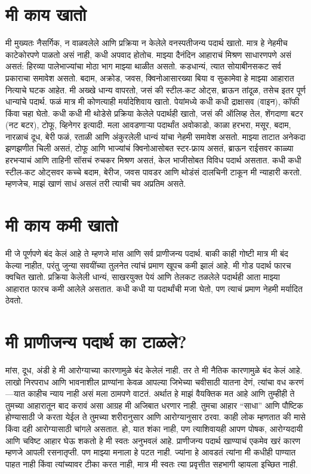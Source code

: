 \section*{मी काय खातो}
मी मुख्यतः नैसर्गिक, न वाळवलेले आणि प्रक्रिया न केलेले वनस्पतीजन्य पदार्थ खातो. मात्र हे नेहमीच काटेकोरपणे पाळतो असं नाही, कधी अपवाद होतोच. माझ्या दैनंदिन आहाराचं मिश्रण साधारणपणे असं असतं:
हिरव्या पालेभाज्यांचा मोठा भाग माझ्या थाळीत असतो. 
कडधान्यं, त्यात सोयाबीनसकट सर्व प्रकाराचा समावेश असतो. 
बदाम, अक्रोड, जवस, क्विनोआसारख्या बिया व सुकामेवा हे माझ्या आहारात नित्याचे घटक आहेत. 
मी अख्खे धान्य वापरतो, जसं की स्टील-कट ओट्स, ब्राऊन तांदूळ, तसेच इतर पूर्ण धान्यांचे पदार्थ. 
फळं मात्र मी कोणत्याही मर्यादेशिवाय खातो. 
पेयांमध्ये कधी कधी द्राक्षासव (वाइन), कॉफी किंवा चहा घेतो.
कधी कधी मी थोडेसे प्रक्रिया केलेले पदार्थही खातो, जसं की ऑलिव्ह तेल, शेंगदाणा बटर (नट बटर), टोफू, व्हिनेगर इत्यादी. मला आवडणाऱ्या पदार्थांत अवोकाडो, काळा हरभरा, मसूर, बदाम, नारळाचं दूध, बेरी फळं, रताळी आणि अंकुरलेली धान्यं यांचा नेहमी समावेश असतो.
माझ्या ताटात अनेकदा झणझणीत चिली असतं, टोफू आणि भाज्यांचं क्विनोआसोबत स्टर-फ्राय असतं, ब्राऊन राईसवर काळ्या हरभऱ्याचं आणि ताहिनी सॉसचं रुचकर मिश्रण असतं, केल भाजीसोबत विविध पदार्थ असतात. कधी कधी स्टील-कट ओट्सवर कच्चे बदाम, बेरीज, जवस पावडर आणि थोडंसं दालचिनी टाकून मी न्याहारी करतो. म्हणजेच, माझं खाणं साधं असलं तरी त्याची चव अप्रतिम असते.
\section*{मी काय कमी खातो}
मी जे पूर्णपणे बंद केलं आहे ते म्हणजे मांस आणि सर्व प्राणीजन्य पदार्थ. बाकी काही गोष्टी मात्र मी बंद केल्या नाहीत, परंतु जुन्या सवयींच्या तुलनेत त्यांचं प्रमाण खूपच कमी झालं आहे.
मी गोड पदार्थ फारच क्वचित खातो. प्रक्रिया केलेली धान्यं, साखरयुक्त पेयं आणि तेलकट तळलेले पदार्थही आता माझ्या आहारात फारच कमी आलेले असतात. कधी कधी या पदार्थांची मजा घेतो, पण त्याचं प्रमाण नेहमी मर्यादित ठेवतो.
\section*{मी प्राणीजन्य पदार्थ का टाळले?}
मांस, दूध, अंडी हे मी आरोग्याच्या कारणामुळे बंद केलेलं नाही. तर ते मी नैतिक कारणामुळे बंद केलं आहे. लाखो निरपराध आणि भावनाशील प्राण्यांना केवळ आपल्या जिभेच्या चवीसाठी यातना देणं, त्यांचा वध करणं—यात काहीच न्याय नाही असं मला ठामपणे वाटतं. अर्थात हे माझं वैयक्तिक मत आहे आणि तुम्हीही ते तुमच्या आहारातून बाद करावं असा आग्रह मी अजिबात धरणार नाही. तुमचा आहार “साधा” आणि पौष्टिक होण्यासाठी जे करता येईल ते तुमच्या शरीरानुसार आणि आरोग्यानुसार ठरवा. 
काही लोक म्हणतात की मासे किंवा दही आरोग्यासाठी चांगले असतात. हो, यात शंका नाही, पण त्याशिवायही आपण पोषक, आरोग्यदायी आणि चविष्ट आहार घेऊ शकतो हे मी स्वतः अनुभवलं आहे.
प्राणीजन्य पदार्थ खाण्याचं एकमेव खरं कारण म्हणजे आपली रसनातृप्ती. पण माझ्या मनाला हे पटत नाही. ज्यांना हे आवडतं त्यांना मी कधीही पाण्यात पाहत नाही किंवा त्यांच्यावर टीका करत नाही, मात्र मी स्वतः त्या प्रवृत्तीत सहभागी व्हायला इच्छित नाही.
